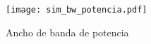 \begin{figure}[H]
	\centering
	\texttt{[image: sim\_bw\_potencia.pdf]}
	\caption{Ancho de banda de potencia}
	\label{fig:sim_bw}
\end{figure}

